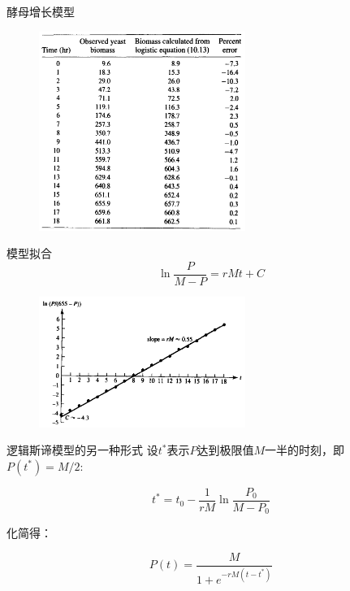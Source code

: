 \documentclass[mathserif, table]{beamer}
\begin{document}
\begin{frame}{酵母增长模型}
  \begin{figure}
    \centering
    \includegraphics[width=0.6\textwidth]{yeast.png}
  \end{figure}
\end{frame}

\begin{frame}{模型拟合}
  \[
  \ln \frac{P}{M-P} = rMt + C
  \]

  \begin{figure}
    \centering
    \includegraphics[width=0.6\textwidth]{yp.png}
  \end{figure}
\end{frame}

\begin{frame}{逻辑斯谛模型的另一种形式}
  设$t^*$表示$P$达到极限值$M$一半的时刻，即$P(t^*) = M/2$:

  \[
  t^* = t_0 - \frac{1}{rM} \ln \frac{P_0}{M-P_0}
  \]

  化简得：

  \[
  P(t) = \frac{M}{1 + e^{-rM(t-t^*)}}
  \]
  
\end{frame}
\end{document}
